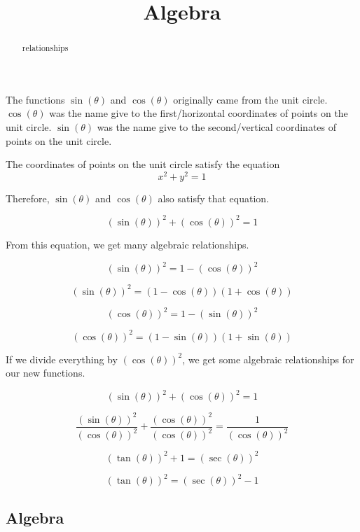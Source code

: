 \documentclass{ximera}
\title{Algebra}
\begin{document}
\begin{abstract}
relationships
\end{abstract}
\maketitle







The functions $\sin(\theta)$ and $\cos(\theta)$ originally came from the unit circle.  $\cos(\theta)$ was the name give to the first/horizontal coordinates of points on the unit circle.   $\sin(\theta)$ was the name give to the second/vertical coordinates of points on the unit circle. 


The coordinates of points on the unit circle satisfy the equation
\[
x^2 + y^2 = 1
\]


Therefore, $\sin(\theta)$ and $\cos(\theta)$ also satisfy that equation.


\[
(\sin(\theta))^2 + (\cos(\theta))^2 = 1
\]


From this equation, we get many algebraic relationships.



\[
(\sin(\theta))^2  = 1 - (\cos(\theta))^2
\]


\[
(\sin(\theta))^2  = (1 - \cos(\theta))  (1 + \cos(\theta))
\]




\[
(\cos(\theta))^2  = 1 - (\sin(\theta))^2
\]


\[
(\cos(\theta))^2  = (1 - \sin(\theta))  (1 + \sin(\theta))
\]



If we divide everything by $(\cos(\theta))^2$, we get some algebraic relationships for our new functions.


\[
(\sin(\theta))^2 + (\cos(\theta))^2 = 1
\]


\[
\frac{(\sin(\theta))^2}{(\cos(\theta))^2} + \frac{(\cos(\theta))^2}{(\cos(\theta))^2} = \frac{1}{(\cos(\theta))^2}
\]


\[
(\tan(\theta))^2 + 1 = (\sec(\theta))^2
\]


\[
(\tan(\theta))^2  = (\sec(\theta))^2 - 1
\]





\subsection*{Algebra}
\end{document}
